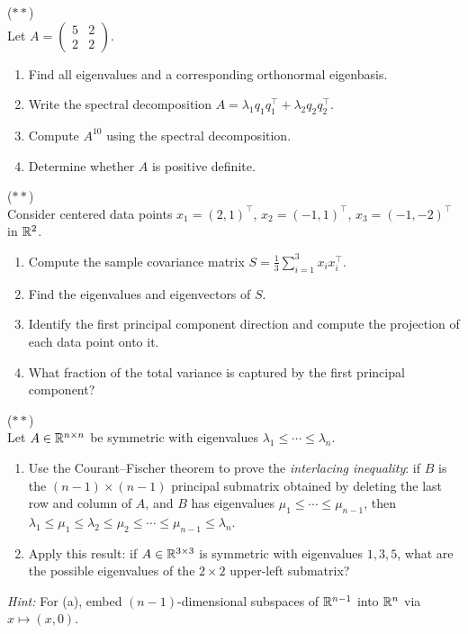 \documentclass[11pt,a4paper]{article}
\begin{document}
\begin{exercise}
\label{exer:spectral}
\textnormal{(\(**\))} \\
Let $A = \begin{pmatrix} 5 & 2 \\ 2 & 2 \end{pmatrix}$.
\begin{enumerate}[nosep,label=(\alph*)]
  \item Find all eigenvalues and a corresponding orthonormal eigenbasis.
  \item Write the spectral decomposition $A = \lambda_1 q_1 q_1^\top + \lambda_2 q_2 q_2^\top$.
  \item Compute $A^{10}$ using the spectral decomposition.
  \item Determine whether $A$ is positive definite.
\end{enumerate}
\end{exercise}

\begin{exercise}
\label{exer:pca}
\textnormal{(\(**\))} \\
Consider centered data points $x_1 = (2, 1)^\top$, $x_2 = (-1, 1)^\top$,
$x_3 = (-1, -2)^\top$ in $\mathbb{R}^2$.
\begin{enumerate}[nosep,label=(\alph*)]
  \item Compute the sample covariance matrix
        $S = \frac{1}{3}\sum_{i=1}^3 x_i x_i^\top$.
  \item Find the eigenvalues and eigenvectors of $S$.
  \item Identify the first principal component direction and compute the
        projection of each data point onto it.
  \item What fraction of the total variance is captured by the first
        principal component?
\end{enumerate}
\end{exercise}

\begin{exercise}
\label{exer:courant_fischer}
\textnormal{(\(**\))} \\
Let $A \in \mathbb{R}^{n \times n}$ be symmetric with eigenvalues
$\lambda_1 \leq \cdots \leq \lambda_n$.
\begin{enumerate}[nosep,label=(\alph*)]
  \item Use the Courant--Fischer theorem to prove the \emph{interlacing
        inequality}: if $B$ is the $(n-1) \times (n-1)$ principal submatrix
        obtained by deleting the last row and column of $A$, and $B$ has
        eigenvalues $\mu_1 \leq \cdots \leq \mu_{n-1}$, then
        $\lambda_1 \leq \mu_1 \leq \lambda_2 \leq \mu_2 \leq \cdots
        \leq \mu_{n-1} \leq \lambda_n$.
  \item Apply this result: if $A \in \mathbb{R}^{3 \times 3}$ is symmetric with
        eigenvalues $1, 3, 5$, what are the possible eigenvalues of the
        $2 \times 2$ upper-left submatrix?
\end{enumerate}
\textit{Hint:} For (a), embed $(n-1)$-dimensional subspaces of
$\mathbb{R}^{n-1}$ into $\mathbb{R}^n$ via $x \mapsto (x, 0)$.
\end{exercise}
\end{document}
